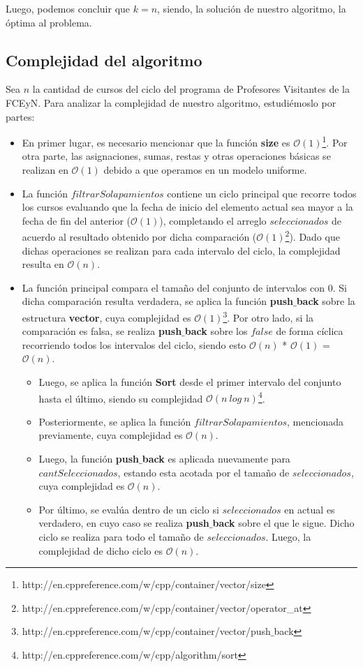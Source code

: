 Luego, podemos concluir que $k = n$, siendo, la solución de nuestro algoritmo, la óptima al problema. 

\subsection{Complejidad del algoritmo}

Sea $n$ la cantidad de cursos del ciclo del programa de Profesores Visitantes de la FCEyN. Para analizar la complejidad de nuestro algoritmo, estudiémoslo por partes:
\begin{itemize}
\item En primer lugar, es necesario mencionar que la función \textbf{size} es $\mathcal{O}(1)$\footnote{http://en.cppreference.com/w/cpp/container/vector/size}. Por otra parte, las asignaciones, sumas, restas y otras operaciones básicas se realizan en $\mathcal{O}(1)$ debido a que operamos en un modelo uniforme.
\item La función $filtrarSolapamientos$ contiene un ciclo principal que recorre todos los cursos evaluando que la fecha de inicio del elemento actual sea mayor a la fecha de fin del anterior ($\mathcal{O}(1)$), completando el arreglo $seleccionados$ de acuerdo al resultado obtenido por dicha comparación ($\mathcal{O}(1)$\footnote{http://en.cppreference.com/w/cpp/container/vector/operator\_at}). Dado que dichas operaciones se realizan para cada intervalo del ciclo, la complejidad resulta en $\mathcal{O}(n)$.
\item La función principal 	compara el tamaño del conjunto de intervalos con 0. Si dicha comparación resulta verdadera, se aplica la función \textbf{push$\_$back} sobre la estructura \textbf{vector}, cuya complejidad es $\mathcal{O}(1)$\footnote{http://en.cppreference.com/w/cpp/container/vector/push$\_$back}. Por otro lado, si la comparación es falsa, se realiza \textbf{push$\_$back} sobre los $false$ de forma cíclica recorriendo todos los intervalos del ciclo, siendo esto $\mathcal{O}(n)$ * $\mathcal{O}(1)$ = $\mathcal{O}(n)$.
\begin{itemize}
\item Luego, se aplica la función \textbf{Sort} desde el primer intervalo del conjunto hasta el último, siendo su complejidad $\mathcal{O}(n\ log\ n)$\footnote{http://en.cppreference.com/w/cpp/algorithm/sort}.
\item Posteriormente, se aplica la función $filtrarSolapamientos$, mencionada previamente, cuya complejidad es $\mathcal{O}(n)$.
\item Luego, la función \textbf{push$\_$back} es aplicada nuevamente para $cantSeleccionados$, estando esta acotada por el tamaño de $seleccionados$, cuya complejidad es $\mathcal{O}(n)$.
\item Por último, se evalúa dentro de un ciclo 	si $seleccionados$ en actual es verdadero, en cuyo caso se realiza \textbf{push$\_$back} sobre el que le sigue. Dicho ciclo se realiza para todo el tamaño de $seleccionados$. Luego, la complejidad de dicho ciclo es $\mathcal{O}(n)$.
\end{itemize}
\end{itemize}

